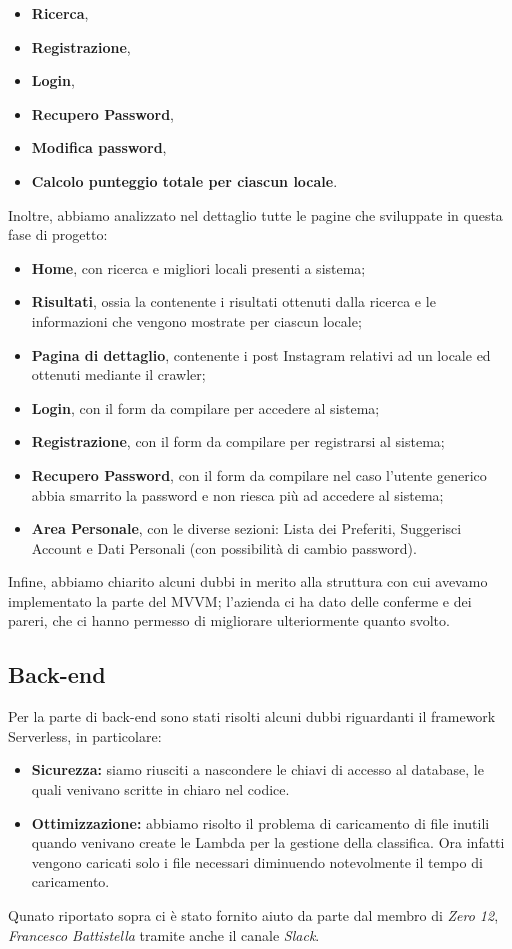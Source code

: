 \begin{itemize}
\item \textbf{Ricerca},
\item \textbf{Registrazione},
\item \textbf{Login},
\item \textbf{Recupero Password},
\item \textbf{Modifica password},
\item \textbf{Calcolo punteggio totale per ciascun locale}.
\end{itemize}

Inoltre, abbiamo analizzato nel dettaglio tutte le pagine che sviluppate in questa fase di progetto: 

\begin{itemize}
\item \textbf{Home}, con ricerca e migliori locali presenti a sistema;
\item \textbf{Risultati}, ossia la contenente i risultati ottenuti dalla ricerca e le informazioni che vengono mostrate per ciascun locale;
\item \textbf{Pagina di dettaglio}, contenente i post Instagram relativi ad un locale ed ottenuti mediante il crawler;
\item \textbf{Login}, con il form da compilare per accedere al sistema;
\item \textbf{Registrazione}, con il form da compilare per registrarsi al sistema;
\item \textbf{Recupero Password}, con il form da compilare nel caso l'utente generico abbia smarrito la password e non riesca più ad accedere al sistema;
\item \textbf{Area Personale}, con le diverse sezioni: Lista dei Preferiti, Suggerisci Account e Dati Personali (con possibilità di cambio password).
\end{itemize}

Infine, abbiamo chiarito alcuni dubbi in merito alla struttura con cui avevamo implementato la parte del MVVM; l'azienda ci ha dato delle conferme e dei pareri, che ci hanno permesso di migliorare ulteriormente quanto svolto.

\subsection{Back-end}
Per la parte di back-end sono stati risolti alcuni dubbi riguardanti il framework Serverless, in particolare:
\begin{itemize}
	\item \textbf{Sicurezza:} siamo riusciti a nascondere le chiavi di accesso al database, le quali venivano scritte in chiaro nel codice.
 	\item \textbf{Ottimizzazione:} abbiamo risolto il problema di caricamento di file inutili quando venivano create le Lambda per la gestione della classifica. 
	Ora infatti vengono caricati solo i file necessari diminuendo notevolmente il tempo di caricamento.
\end{itemize}

Qunato riportato sopra ci è stato fornito aiuto da parte dal membro di \textit{Zero 12}, \textit{Francesco Battistella} tramite anche il canale \textit{Slack}.


\pagebreak
